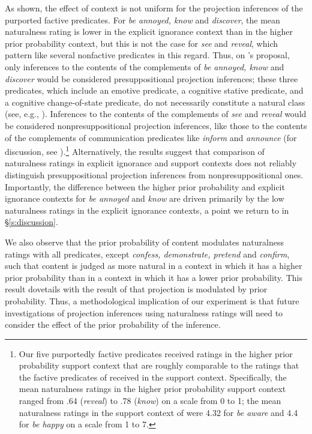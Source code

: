 \documentclass[11pt,fleqn]{article}
\newcommand{\6}{\mbox{$[\hspace*{-.6mm}[$}}
\newcommand{\9}{\mbox{$]\hspace*{-.6mm}]$}}
\newcommand{\citepos}[1]{\citeauthor{#1}'s \citeyear{#1}}
\begin{document}
As shown, the effect of context is not uniform for the projection inferences of the purported factive predicates. For {\em be annoyed, know} and {\em discover}, the mean naturalness rating is lower in the explicit ignorance context than in the higher prior probability context, but this is not the case for {\em see} and {\em reveal}, which pattern like several nonfactive predicates in this regard. Thus, on \citepos{mandelkern-etal2020} proposal, only inferences to the contents of the complements of \emph{be annoyed, know} and \emph{discover} would be considered presuppositional projection inferences; these three predicates, which include an emotive predicate, a cognitive stative predicate, and a cognitive change-of-state predicate, do not necessarily constitute a natural class (see, e.g., \citealt{karttunen2016,djaerv-thesis}). Inferences to the contents of the complements of \emph{see} and \emph{reveal} would be considered nonpresuppositional projection inferences, like those to the contents of the complements of communication predicates like \emph{inform} and \emph{announce} (for discussion, see \citealt{anand-hacquard2014}).\footnote{Our five purportedly factive predicates received ratings in the higher prior probability support context that are roughly comparable to the ratings that the factive predicates of \citealt{mandelkern-etal2020} received in the support context. Specifically, the mean naturalness ratings in the higher prior probability support context ranged from .64 ({\em reveal}) to .78 ({\em know}) on a scale from 0 to 1; the mean naturalness ratings in the support context of \citealt{mandelkern-etal2020} were 4.32  for {\em be aware} and 4.4 for {\em be happy} on a scale from 1 to 7.} Alternatively, the results suggest that comparison of naturalness ratings in explicit ignorance and support contexts does not reliably distinguish presuppositional projection inferences from nonpresuppositional ones. Importantly, the difference between the higher prior probability and explicit ignorance contexts for \emph{be annoyed} and \emph{know} are driven primarily by the low naturalness ratings in the explicit ignorance contexts, a point we return to in \S\ref{s:discussion}.


We also observe that the prior probability of content modulates naturalness ratings with all predicates, except {\em confess, demonstrate, pretend} and {\em confirm}, such that content is judged as more natural in a context in which it has a higher prior probability than in a context in which it has a lower prior probability. This result dovetails with the result of \citealt{degen-tonhauser-openmind} that projection is modulated by prior probability. Thus, a methodological implication of our experiment is that future investigations of projection inferences using naturalness ratings will need to consider the effect of the prior probability of the inference.
\end{document}
